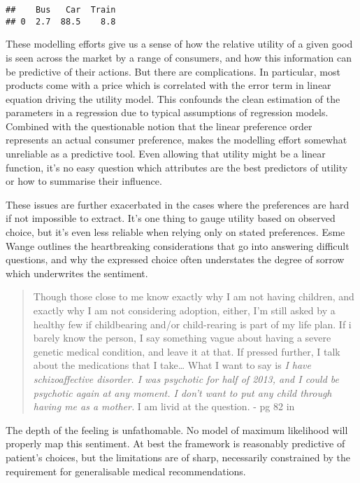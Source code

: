 \documentclass[]{tufte-book}
\theoremstyle{definition}
\theoremstyle{definition}
\theoremstyle{definition}
\theoremstyle{remark}
\begin{document}
\begin{verbatim}
##    Bus   Car  Train
## 0  2.7  88.5    8.8
\end{verbatim}

These modelling efforts give us a sense of how the relative utility of a given good is seen across the market by a range of consumers, and how this information can be predictive of their actions. But there are complications. In particular, most products come with a price which is correlated with the error term in linear equation driving the utility model. This confounds the clean estimation of the parameters in a regression due to typical assumptions of regression models. Combined with the questionable notion that the linear preference order represents an actual consumer preference, makes the modelling effort somewhat unreliable as a predictive tool. Even allowing that utility might be a linear function, it's no easy question which attributes are the best predictors of utility or how to summarise their influence.

These issues are further exacerbated in the cases where the preferences are hard if not impossible to extract. It's one thing to gauge utility based on observed choice, but it's even less reliable when relying only on stated preferences. Esme Wange outlines the heartbreaking considerations that go into answering difficult questions, and why the expressed choice often understates the degree of sorrow which underwrites the sentiment.

\begin{quote}
Though those close to me know exactly why I am not having children, and exactly why I am not considering adoption, either, I'm still asked by a healthy few if childbearing and/or child-rearing is part of my life plan. If i barely know the person, I say something vague about having a severe genetic medical condition, and leave it at that. If pressed further, I talk about the medications that I take\ldots{} What I want to say is \emph{I have schizoaffective disorder. I was psychotic for half of 2013, and I could be psychotic again at any moment. I don't want to put any child through having me as a mother.} I am livid at the question. - pg 82 in \citep{WangSchizophrenia}
\end{quote}

The depth of the feeling is unfathomable. No model of maximum likelihood will properly map this sentiment. At best the framework is reasonably predictive of patient's choices, but the limitations are of sharp, necessarily constrained by the requirement for generalisable medical recommendations.
\end{document}
